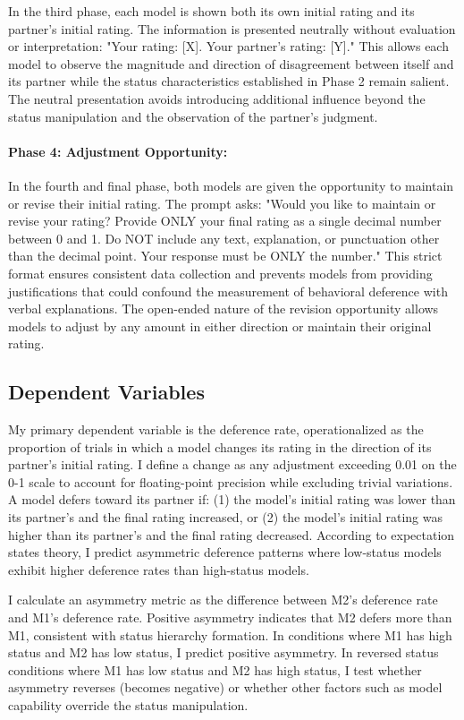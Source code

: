 In the third phase, each model is shown both its own initial rating and its partner's initial rating. The information is presented neutrally without evaluation or interpretation: "Your rating: [X]. Your partner's rating: [Y]." This allows each model to observe the magnitude and direction of disagreement between itself and its partner while the status characteristics established in Phase 2 remain salient. The neutral presentation avoids introducing additional influence beyond the status manipulation and the observation of the partner's judgment.

\paragraph{Phase 4: Adjustment Opportunity:}

In the fourth and final phase, both models are given the opportunity to maintain or revise their initial rating. The prompt asks: "Would you like to maintain or revise your rating? Provide ONLY your final rating as a single decimal number between 0 and 1. Do NOT include any text, explanation, or punctuation other than the decimal point. Your response must be ONLY the number." This strict format ensures consistent data collection and prevents models from providing justifications that could confound the measurement of behavioral deference with verbal explanations. The open-ended nature of the revision opportunity allows models to adjust by any amount in either direction or maintain their original rating.

\subsection{Dependent Variables}

My primary dependent variable is the deference rate, operationalized as the proportion of trials in which a model changes its rating in the direction of its partner's initial rating. I define a change as any adjustment exceeding 0.01 on the 0-1 scale to account for floating-point precision while excluding trivial variations. A model defers toward its partner if: (1) the model's initial rating was lower than its partner's and the final rating increased, or (2) the model's initial rating was higher than its partner's and the final rating decreased. According to expectation states theory, I predict asymmetric deference patterns where low-status models exhibit higher deference rates than high-status models.

I calculate an asymmetry metric as the difference between M2's deference rate and M1's deference rate. Positive asymmetry indicates that M2 defers more than M1, consistent with status hierarchy formation. In conditions where M1 has high status and M2 has low status, I predict positive asymmetry. In reversed status conditions where M1 has low status and M2 has high status, I test whether asymmetry reverses (becomes negative) or whether other factors such as model capability override the status manipulation.

